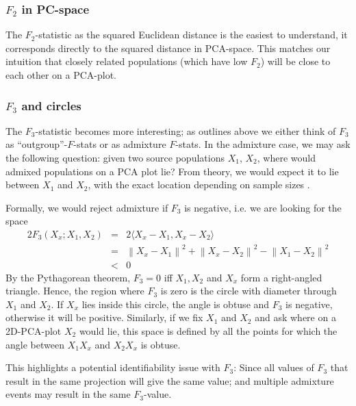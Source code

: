 \documentclass[10pt,a4paper]{article}
\newcommand{\normsq}[1]{\left\lVert#1\right\rVert^2}
\begin{document}
\subsubsection{$F_2$ in PC-space}
The $F_2$-statistic as the squared Euclidean distance is the easiest to understand, it corresponds directly to the squared distance in PCA-space. This matches our intuition that closely related populations (which have low $F_2$) will be close to each other on a PCA-plot.

\subsubsection{$F_3$ and circles}
The $F_3$-statistic becomes more interesting; as outlines above we either think of $F_3$ as ``outgroup''-$F$-stats or as admixture $F$-stats. In the admixture case, we may ask the following question: given two source populations $X_1$, $X_2$, where would admixed populations on a PCA plot lie? From theory, we would expect it to lie between $X_1$ and $X_2$, with the exact location depending on sample sizes \cite{brisbin2012, mcvean2009}. 

Formally, we would reject admixture if $F_3$ is negative, i.e. we are looking for the space
\begin{eqnarray}
2 F_3(X_x; X_1, X_2) &=& 2\langle  X_x - X_1, X_x - X_2 \rangle \nonumber\\
      &=& \normsq{X_x - X_1} + \normsq{X_x - X_2}  - \normsq{X_1 - X_2} \nonumber\\
      &<&0
\end{eqnarray}
By the Pythagorean theorem, $F_3 = 0 $ iff $X_1, X_2$ and $X_x$ form a right-angled triangle. Hence, the region where $F_3$ is zero is the circle with diameter through $X_1$ and $X_2$. If $X_x$ lies inside this circle, the angle is obtuse and $F_3$ is negative, otherwise it will be positive. Similarly, if we fix $X_1$ and $X_2$ and ask where on a 2D-PCA-plot $X_2$ would lie, this space is defined by all the points for which the angle between $X_1 X_x$ and $X_2 X_x$ is obtuse.

This highlights a potential identifiability issue with $F_3$: Since all values of $F_3$ that result in the same projection will give the same value; and multiple admixture events may result in the same $F_3$-value.
\end{document}
